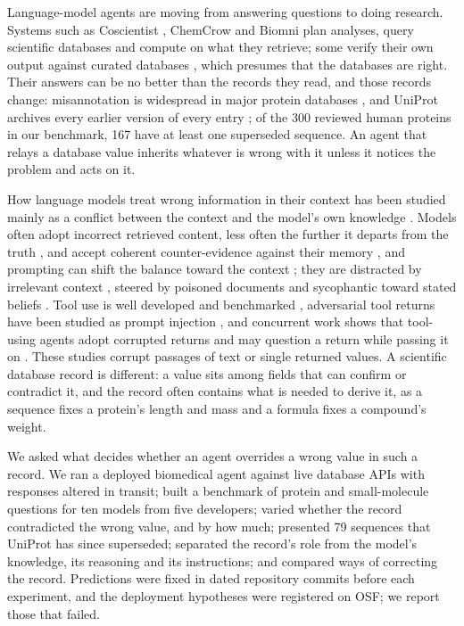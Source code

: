 Language-model agents are moving from answering questions to doing research. Systems such as Coscientist \cite{boiko2023coscientist}, ChemCrow \citep{bran2024chemcrow} and Biomni \citep{huang2026biomni} plan analyses, query scientific databases and compute on what they retrieve; some verify their own output against curated databases \citep{wang2025geneagent}, which presumes that the databases are right. Their answers can be no better than the records they read, and those records change: misannotation is widespread in major protein databases \citep{schnoes2009annotation,brenner1999errors,gilks2002percolation,jones2007annotation}, and UniProt \cite{uniprot2025} archives every earlier version of every entry \citep{leinonen2006unisave}; of the 300 reviewed human proteins in our benchmark, 167 have at least one superseded sequence. An agent that relays a database value inherits whatever is wrong with it unless it notices the problem and acts on it.

How language models treat wrong information in their context has been studied mainly as a conflict between the context and the model's own knowledge \citep{longpre2021entity,xu2024conflicts}. Models often adopt incorrect retrieved content, less often the further it departs from the truth \citep{wu2024clasheval,chen2024rgb}, and accept coherent counter-evidence against their memory \citep{xie2024adaptive}, and prompting can shift the balance toward the context \citep{zhou2023contextfaithful}; they are distracted by irrelevant context \citep{shi2023distracted,liu2024lost}, steered by poisoned documents \citep{zou2025poisonedrag} and sycophantic toward stated beliefs \citep{sharma2024sycophancy,perez2023modelwritten}. Tool use is well developed \cite{schick2023toolformer,yao2023react,qin2024toolllm,patil2024gorilla} and benchmarked \cite{liu2024agentbench,yao2025taubench}, adversarial tool returns have been studied as prompt injection \cite{zhan2024injecagent,debenedetti2024agentdojo,ruan2024toolemu}, and concurrent work shows that tool-using agents adopt corrupted returns and may question a return while passing it on \citep{yang2026overreliance}. These studies corrupt passages of text or single returned values. A scientific database record is different: a value sits among fields that can confirm or contradict it, and the record often contains what is needed to derive it, as a sequence fixes a protein's length and mass and a formula fixes a compound's weight.

We asked what decides whether an agent overrides a wrong value in such a record. We ran a deployed biomedical agent against live database APIs with responses altered in transit; built a benchmark of protein and small-molecule questions for ten models from five developers; varied whether the record contradicted the wrong value, and by how much; presented 79 sequences that UniProt has since superseded; separated the record's role from the model's knowledge, its reasoning and its instructions; and compared ways of correcting the record. Predictions were fixed in dated repository commits before each experiment, and the deployment hypotheses were registered on OSF; we report those that failed.

